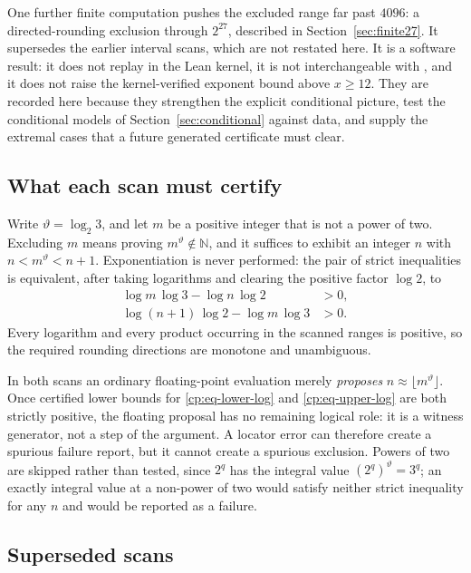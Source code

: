 \documentclass[11pt,oneside]{article}
\theoremstyle{definition}
\theoremstyle{remark}
\newcommand{\N}{\mathbb N}
\newcommand{\thetaq}{\vartheta}
\newcommand{\lean}[1]{\texttt{\detokenize{#1}}}
\begin{document}
One further finite computation pushes the excluded range far past $4096$: a
directed-rounding exclusion through $2^{27}$, described in
Section~\ref{sec:finite27}.  It supersedes the earlier interval scans, which are not
restated here.  It is a software result: it does not replay in the Lean kernel, it is not
interchangeable with \lean{FiniteCheck4096}, and it does not raise the kernel-verified
exponent bound above $x\ge12$.  They are recorded here because they strengthen the explicit
conditional picture, test the conditional models of Section~\ref{sec:conditional} against
data, and supply the extremal cases that a future generated certificate must clear.

\subsection{What each scan must certify}
\label{cp:sub-certificate}

Write $\thetaq=\log_2 3$, and let $m$ be a positive integer that is not a power of two.
Excluding $m$ means proving $m^{\thetaq}\notin\N$, and it suffices to exhibit an integer $n$
with $n<m^{\thetaq}<n+1$.  Exponentiation is never performed: the pair of strict inequalities
is equivalent, after taking logarithms and clearing the positive factor $\log 2$, to
\begin{align}
\log m\,\log3-\log n\,\log2&>0,\label{cp:eq-lower-log}\\
\log(n+1)\,\log2-\log m\,\log3&>0.\label{cp:eq-upper-log}
\end{align}
Every logarithm and every product occurring in the scanned ranges is positive, so the
required rounding directions are monotone and unambiguous.

In both scans an ordinary floating-point evaluation merely \emph{proposes}
$n\approx\lfloor m^{\thetaq}\rfloor$.  Once certified lower bounds for
\eqref{cp:eq-lower-log} and \eqref{cp:eq-upper-log} are both strictly positive, the floating
proposal has no remaining logical role: it is a witness generator, not a step of the
argument.  A locator error can therefore create a spurious failure report, but it cannot
create a spurious exclusion.  Powers of two are skipped rather than tested, since $2^q$ has
the integral value $(2^q)^{\thetaq}=3^q$; an exactly integral value at a non-power of two
would satisfy neither strict inequality for any $n$ and would be reported as a failure.

\subsection{Superseded scans}
\end{document}

